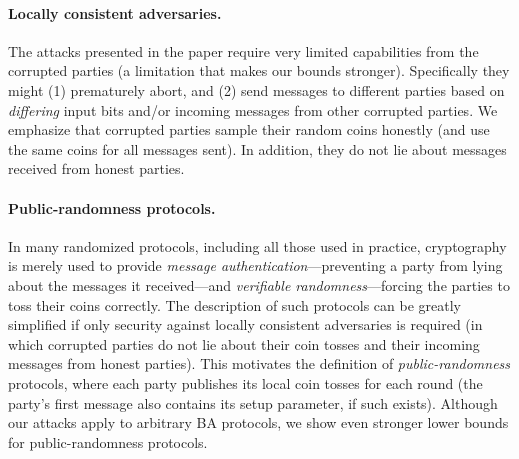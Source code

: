 \paragraph{Locally consistent adversaries.}
The attacks presented in the paper require very limited capabilities from the corrupted parties  (a limitation that makes our bounds stronger). Specifically they might (1) prematurely abort, and (2) send messages to different parties based on \emph{differing} input bits and/or incoming messages from other corrupted parties. We emphasize that corrupted parties sample their random coins honestly (and use the same coins for all messages sent). In addition,
they do not lie about messages received from honest parties.

%	
%	

\paragraph{Public-randomness protocols.}
In many randomized
protocols, including all those used in practice, cryptography is merely used to provide \emph{message authentication}---preventing a  party from lying about the messages it received---and \emph{verifiable randomness}---forcing the parties to toss their coins correctly. The description of such protocols can be greatly simplified if only security against locally consistent adversaries is required (in which corrupted parties do not lie about their coin tosses and their incoming messages from honest parties). This motivates the definition of \emph{public-randomness} protocols, where each party publishes its local coin tosses for each round (the party's first message also contains its setup parameter, if such exists).
Although our attacks apply to arbitrary BA protocols, we show even stronger lower bounds for public-randomness protocols.

